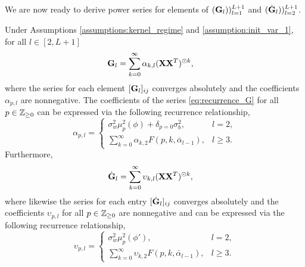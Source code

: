 We are now ready to derive power series for elements of $(\mathbf{G}_l))_{l=1}^{L+1}$ and $(\dot{\mathbf{G}}_l))_{l=2}^{L+1}$. 

\begin{lemma} \label{lemma:power_series_G}
     Under Assumptions \ref{assumptions:kernel_regime} and \ref{assumption:init_var_1}, for all $l \in [2,L+1]$
    \begin{equation}\label{eq:recurrence_G}
        \begin{aligned}
            &\mathbf{G}_{l} = \sum_{k=0}^{\infty} \alpha_{k,l}(\mathbf{X}\mathbf{X}^T)^{\odot k},
        \end{aligned}
    \end{equation}
    where the series for each element $[\mathbf{G}_{l}]_{ij}$ converges absolutely and the coefficients $\alpha_{p,l}$ are nonnegative.
    The coefficients of the series \eqref{eq:recurrence_G} for all $p\in \mathbb{Z}_{\geq 0}$ can be expressed via the following recurrence relationship, 
    \begin{equation}\label{eq:recurrence_G_coeffs}
        \alpha_{p,l} = 
        \begin{cases}
            \sigma_w^2 \mu_p^2(\phi) + \delta_{p=0}\sigma_b^2, &l=2,\\
            \sum_{k=0}^{\infty}\alpha_{k,2} F(p,k,\bar{\alpha}_{l-1}), &l\geq 3.
        \end{cases}
    \end{equation}
    Furthermore,
    \begin{equation} \label{eq:recurrence_Gdot}
        \begin{aligned}
            &\dot{\mathbf{G}}_{l} = \sum_{k=0}^{\infty} \upsilon_{k,l}(\mathbf{X}\mathbf{X}^T)^{\odot k},
        \end{aligned}
    \end{equation}
    where likewise the series for each entry $[\dot{\mathbf{G}}_{l}]_{ij}$ converges absolutely and the coefficients $\upsilon_{p,l}$ for all $p\in \mathbb{Z}_{\geq 0}$ are nonnegative and can be expressed via the following recurrence relationship, 
     \begin{equation}\label{eq:recurrence_Gdot_coeffs}
        \upsilon_{p,l} = 
        \begin{cases}
            \sigma_w^2 \mu_p^2(\phi'), &l=2,\\
            \sum_{k=0}^{\infty} \upsilon_{k,2} F(p,k,\bar{\alpha}_{l-1}), &l\geq3.
        \end{cases}
    \end{equation}
\end{lemma}

